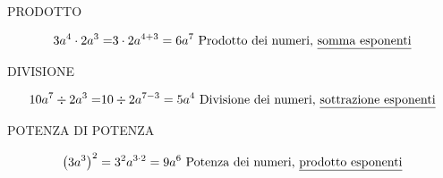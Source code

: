 \documentclass[preview]{standalone}
\begin{document}
	\begin{center}
		{\Huge PRODOTTO}
	\end{center}
\begin{align*}
3a^4\cdot 2a^3=&3\cdot 2 a^{4+3}=6a^7\text{ Prodotto dei numeri, \underline{somma esponenti}}\\
\end{align*}
	\begin{center}
	{\Huge DIVISIONE}
\end{center}
\begin{align*}
10a^7\div 2a^3=&10\div 2 a^{7-3}=5a^4\text{ Divisione dei numeri, \underline{sottrazione esponenti}}\\
\end{align*}
	\begin{center}
	{\Huge POTENZA DI POTENZA}
\end{center}
\begin{align*}
\left(3a^3\right)^2=3^2 a^{3\cdot 2}=9a^6\text{ Potenza dei numeri, \underline{prodotto esponenti}}\\
\end{align*}
\end{document}
